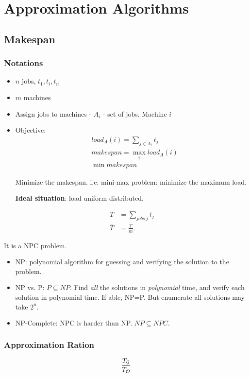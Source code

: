 \documentclass[a4paper]{report}
\theoremstyle{definition}
\begin{document}
\chapter{Approximation Algorithms}
\section{Makespan}
\subsection{Notations}
\begin{itemize}
\item $n$ jobs, $t_1, t_i, t_n$
\item $m$ machines
\item Assign jobs to machines - $A_i$ - set of jobs. Machine $i$
\item Objective:
\begin{align*}
&load_A(i)=\sum_{j\in A_i} t_j\\
&makespan = \max_i load_A(i)\\
&\min makespan
\end{align*}

Minimize the makespan. i.e. mini-max problem: minimize the maximum load.

\textbf{Ideal situation}: load uniform distributed.

\begin{align*}
T&=\sum_{jobs~j}t_j\\
\bar T &= \frac{T}{m}.
\end{align*}
\end{itemize}

It is a NPC problem.

\begin{itemize}
\item NP: polynomial algorithm for guessing and verifying the solution to the problem.
\item NP vs. P: $P\subseteq NP$. Find \textit{all} the solutions in \textit{polynomial} time, and verify each solution in polynomial time. If able, NP=P. But enumerate all solutions may take $2^n$.
\item NP-Complete: NPC is harder than NP. $NP\subseteq NPC$.
\end{itemize}

\subsection{Approximation Ration}
$$
\frac{T_{\mathcal{G}}}{T_{\mathcal{O}}}
$$
\end{document}
